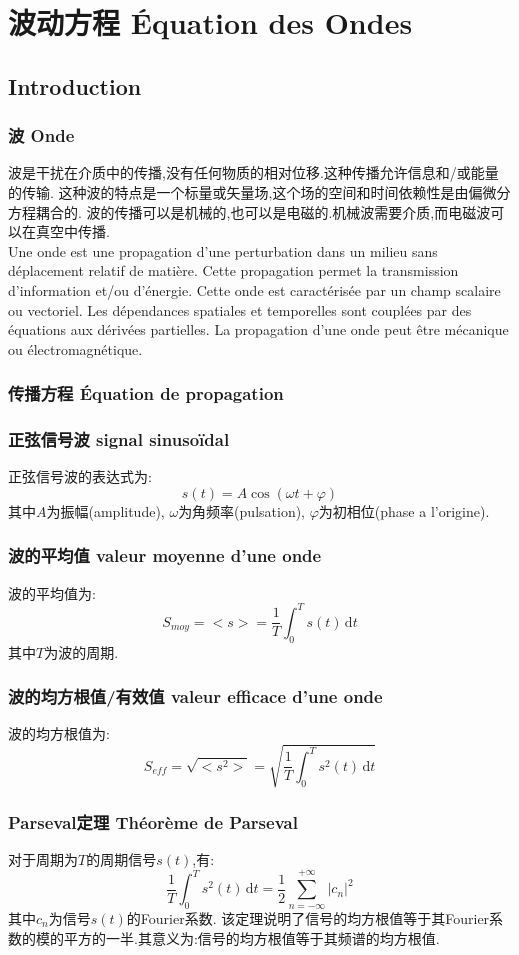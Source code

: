 \documentclass[12pt, a4paper, oneside]{ctexbook}
\begin{document}
\section{波动方程 Équation des Ondes}
\subsection{Introduction}
\subsubsection{波 Onde}
波是干扰在介质中的传播,没有任何物质的相对位移.这种传播允许信息和/或能量的传输.
这种波的特点是一个标量或矢量场,这个场的空间和时间依赖性是由偏微分方程耦合的.
波的传播可以是机械的,也可以是电磁的.机械波需要介质,而电磁波可以在真空中传播.
\\
\indent
Une onde est une propagation d'une perturbation dans un milieu sans déplacement relatif de matière.
Cette propagation permet la transmission d'information et/ou d'énergie.
Cette onde est caractérisée par un champ scalaire ou vectoriel.
Les dépendances spatiales et temporelles sont couplées par des équations aux dérivées partielles.
La propagation d'une onde peut être mécanique ou électromagnétique.
\subsubsection{传播方程 Équation de propagation}

\subsubsection{正弦信号波 signal sinusoïdal}
正弦信号波的表达式为:
$$
  s(t)=A\cos(\omega t+\varphi)
$$
其中$A$为振幅(amplitude), $\omega$为角频率(pulsation), $\varphi$为初相位(phase a l'origine).
\subsubsection{波的平均值 valeur moyenne d'une onde}
波的平均值为:
$$
  S_{moy}=<s>=\frac{1}{T}\int_{0}^{T}s(t)\,\mathrm{d}t
$$
其中$T$为波的周期.
\subsubsection{波的均方根值/有效值 valeur efficace d'une onde}
波的均方根值为:
$$
  S_{eff}=\sqrt{<s^2>}=\sqrt{\frac{1}{T}\int_{0}^{T}s^2(t)\,\mathrm{d}t}
$$

\subsubsection{Parseval定理 Théorème de Parseval}
对于周期为$T$的周期信号$s(t)$,有:
$$
  \frac{1}{T}\int_{0}^{T}s^2(t)\,\mathrm{d}t=\frac{1}{2}\sum_{n=-\infty}^{+\infty}|c_n|^2
$$
其中$c_n$为信号$s(t)$的Fourier系数.
该定理说明了信号的均方根值等于其Fourier系数的模的平方的一半.其意义为:信号的均方根值等于其频谱的均方根值.
\end{document}
